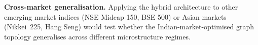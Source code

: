 \documentclass[a4paper,11pt]{report}
\begin{document}
\textbf{Cross-market generalisation.} Applying the hybrid architecture to other emerging market indices (NSE Midcap 150, BSE 500) or Asian markets (Nikkei~225, Hang Seng) would test whether the Indian-market-optimised graph topology generalises across different microstructure regimes.


 
\newpage
{}
          
   
\end{document}
